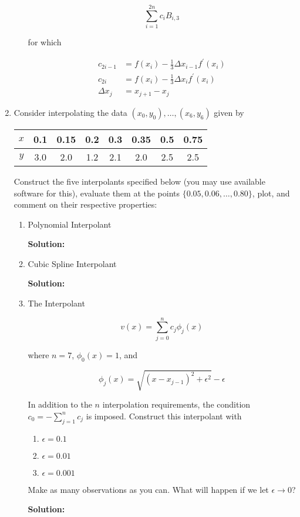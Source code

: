 \documentclass[12pt]{article}
\begin{document}
\begin{enumerate}
\begin{itemize}
  \[
      \sum_{i=1}^{2n}c_{i}B_{i,3}
  \]

  for which

  \begin{align*}
      c_{2i-1} &= f(x_{i}) - \frac{1}{3}\Delta x_{i-1}f^{\prime}(x_{i})\\
      c_{2i} &= f(x_{i}) - \frac{1}{3}\Delta x_{i}f^{\prime}(x_{i})\\
      \Delta x_{j} &= x_{j+1} - x_{j}
  \end{align*}
\end{itemize}


\item Consider interpolating the data $\left(x_{0}, y_{0}\right),\ldots,\left(x_{6}, y_{6}\right)$
given by

\begin{table}[H]
  \centering
  \begin{tabular}{| c | c | c | c | c | c | c | c |}
    $x$ & 0.1 & 0.15 & 0.2 & 0.3 & 0.35 & 0.5 & 0.75\\
    \hline
    $y$ & 3.0 & 2.0 & 1.2 & 2.1 & 2.0 & 2.5 & 2.5
  \end{tabular}
\end{table}

Construct the five interpolants specified below (you may use available software
for this), evaluate them at the points $\{ 0.05, 0.06,\ldots,0.80\}$, plot, and
comment on their respective properties:

\begin{enumerate}
  \item Polynomial Interpolant

  {\bf Solution:}

  \item Cubic Spline Interpolant

  {\bf Solution:}

  \item The Interpolant

  \[
      v(x) = \sum_{j=0}^{n}c_{j}\phi_{j}(x)
  \]

  where $n = 7$, $\phi_{0}(x) = 1$, and

  \[
      \phi_{j}(x) = \sqrt{\left( x - x_{j-1}\right)^{2} + \epsilon^{2}} - \epsilon
  \]

  In addition to the $n$ interpolation requirements, the condition $c_{0} = -\sum_{j=1}^{n}c_{j}$
  is imposed. Construct this interpolant with
    \begin{enumerate}
      \item $\epsilon = 0.1$

      \item $\epsilon = 0.01$

      \item $\epsilon = 0.001$
    \end{enumerate}

  Make as many observations as you can. What will happen if we let $\epsilon \rightarrow 0$?

  {\bf Solution:}


\end{enumerate}

\end{enumerate}
\end{document}
